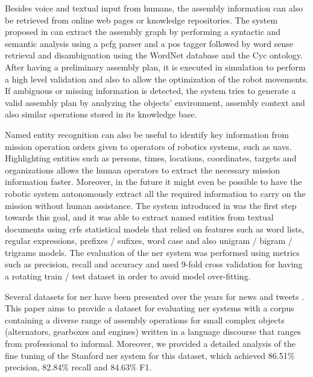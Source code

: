 Besides voice and textual input from humans, the assembly information can also be retrieved from online web pages or knowledge repositories. The system proposed in \cite{Tenorth2010} can extract the assembly graph by performing a syntactic and semantic analysis using a \gls{pcfg} parser and a \gls{pos} tagger followed by word sense retrieval and disambiguation using the WordNet database and the Cyc ontology. After having a preliminary assembly plan, it is executed in simulation to perform a high level validation and also to allow the optimization of the robot movements. If ambiguous or missing information is detected, the system tries to generate a valid assembly plan by analyzing the objects' environment, assembly context and also similar operations stored in its knowledge base.

Named entity recognition can also be useful to identify key information from mission operation orders given to operators of robotics systems, such as \glspl{uav}. Highlighting entities such as persons, times, locations, coordinates, targets and organizations allows the human operators to extract the necessary mission information faster. Moreover, in the future it might even be possible to have the robotic system autonomously extract all the required information to carry on the mission without human assistance. The system introduced in \cite{Chesworth2016} was the first step towards this goal, and it was able to extract named entities from textual documents using \glspl{crf} statistical models that relied on features such as word lists, regular expressions, prefixes / sufixes, word case and also unigram / bigram / trigrams models. The evaluation of the \gls{ner} system was performed using metrics such as precision, recall and accuracy and used 9-fold cross validation for having a rotating train / test dataset in order to avoid model over-fitting.

Several datasets for \gls{ner} have been presented over the years for news and tweets \cite{Dojchinovski2013,Roder2014}. This paper aims to provide a dataset for evaluating \gls{ner} systems with a corpus containing a diverse range of assembly operations for small complex objects (alternators, gearboxes and engines) written in a language discourse that ranges from professional to informal. Moreover, we provided a detailed analysis of the fine tuning of the Stanford \gls{ner} system for this dataset, which achieved 86.51\% precision, 82.84\% recall and 84.63\% F1.
